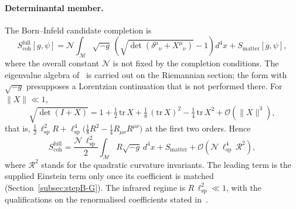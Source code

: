   \paragraph{Determinantal member.}
    The Born--Infeld candidate completion is
    \begin{equation}
      S_{\mathrm{coh}}^{\mathrm{full}}[g, \psi]
      = \mathcal{N} \int_{\mathcal{M}} \sqrt{-g}\,
      \left( \sqrt{\det\!\left( \delta^{\mu}{}_{\nu} + X^{\mu}{}_{\nu} \right)} - 1 \right) d^4x
      + S_{\mathrm{matter}}[g, \psi],
      \label{eq:BI-gravity}
    \end{equation}
    where the overall constant $\mathcal{N}$ is not fixed by the completion conditions.
    The eigenvalue algebra of~\cite{Beau2026h} is carried out on the Riemannian section; the form with
    $\sqrt{-g}$ presupposes a Lorentzian continuation that is not performed there.
    For $\|X\| \ll 1$,
    \begin{equation}
      \sqrt{\det(I + X)}
      = 1 + \tfrac12\,\mathrm{tr}\,X
      + \tfrac18\,(\mathrm{tr}\,X)^2 - \tfrac14\,\mathrm{tr}\,X^2
      + \mathcal{O}(\|X\|^3),
      \label{eq:BI-expand}
    \end{equation}
    that is, $\tfrac12\,\ell_{\mathrm{sp}}^2 R + \ell_{\mathrm{sp}}^4\bigl(\tfrac18 R^2
    - \tfrac14 R_{\mu\nu}R^{\mu\nu}\bigr)$ at the first two orders.
    Hence
    \begin{equation}
      S_{\mathrm{coh}}^{\mathrm{full}}
      = \frac{\mathcal{N}\,\ell_{\mathrm{sp}}^{2}}{2}
      \int_{\mathcal{M}} R \sqrt{-g}\, d^4x
      + S_{\mathrm{matter}}
      + \mathcal{O}\!\left(\mathcal{N}\,\ell_{\mathrm{sp}}^{4}\,\mathcal{R}^{2}\right),
      \label{eq:BI-IR}
    \end{equation}
    where $\mathcal{R}^{2}$ stands for the quadratic curvature invariants.
    The leading term is the supplied Einstein term only once its coefficient is matched
    (Section~\ref{subsec:stepB-G}).
    The infrared regime is $R\,\ell_{\mathrm{sp}}^{2} \ll 1$, with the qualifications on the renormalised
    coefficients stated in~\cite{Beau2026h}.

